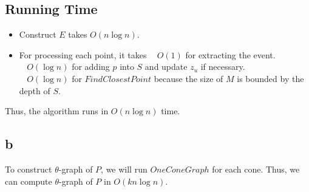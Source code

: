 \documentclass[12pt]{article}
\begin{document}
\subsection*{Running Time}
\begin{itemize}
    \item Construct $E$ takes $O(n\log{n})$.
    \item For processing each point, it takes
    $\;\;$ $O(1)$ for extracting the event.\\
    $\;\;$ $O(\log{n})$ for adding $p$ into $S$ and update $z_u$ if necessary. \\
    $\;\;$ $O(\log{n})$ for $FindClosestPoint$ because the size of $M$ is bounded by the depth of $S$. \\
\end{itemize}

Thus, the algorithm runs in $O(n\log{n})$ time.

\subsection*{b}
To construct $\theta$-graph of $P$, we will run $OneConeGraph$ for each cone. Thus,
we can compute $\theta$-graph of $P$ in $O(kn\log{n})$.
\end{document}

